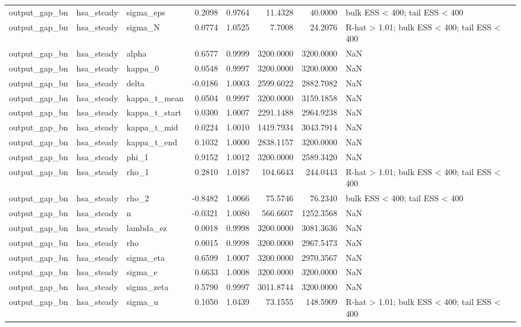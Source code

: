 \begin{tabular}{lllrrrrl}
output\_gap\_bn & hsa\_steady & sigma\_eps & 0.2098 & 0.9764 & 11.4328 & 40.0000 & bulk ESS < 400; tail ESS < 400 \\
output\_gap\_bn & hsa\_steady & sigma\_N & 0.0774 & 1.0525 & 7.7008 & 24.2076 & R-hat > 1.01; bulk ESS < 400; tail ESS < 400 \\
output\_gap\_bn & hsa\_steady & alpha & 0.6577 & 0.9999 & 3200.0000 & 3200.0000 & NaN \\
output\_gap\_bn & hsa\_steady & kappa\_0 & 0.0548 & 0.9997 & 3200.0000 & 3200.0000 & NaN \\
output\_gap\_bn & hsa\_steady & delta & -0.0186 & 1.0003 & 2599.6022 & 2882.7082 & NaN \\
output\_gap\_bn & hsa\_steady & kappa\_t\_mean & 0.0504 & 0.9997 & 3200.0000 & 3159.1858 & NaN \\
output\_gap\_bn & hsa\_steady & kappa\_t\_start & 0.0300 & 1.0007 & 2291.1488 & 2964.9238 & NaN \\
output\_gap\_bn & hsa\_steady & kappa\_t\_mid & 0.0224 & 1.0010 & 1419.7934 & 3043.7914 & NaN \\
output\_gap\_bn & hsa\_steady & kappa\_t\_end & 0.1032 & 1.0000 & 2838.1157 & 3200.0000 & NaN \\
output\_gap\_bn & hsa\_steady & phi\_1 & 0.9152 & 1.0012 & 3200.0000 & 2589.3420 & NaN \\
output\_gap\_bn & hsa\_steady & rho\_1 & 0.2810 & 1.0187 & 104.6643 & 244.0443 & R-hat > 1.01; bulk ESS < 400; tail ESS < 400 \\
output\_gap\_bn & hsa\_steady & rho\_2 & -0.8482 & 1.0066 & 75.5746 & 76.2340 & bulk ESS < 400; tail ESS < 400 \\
output\_gap\_bn & hsa\_steady & n & -0.0321 & 1.0080 & 566.6607 & 1252.3568 & NaN \\
output\_gap\_bn & hsa\_steady & lambda\_ez & 0.0018 & 0.9998 & 3200.0000 & 3081.3636 & NaN \\
output\_gap\_bn & hsa\_steady & rho & 0.0015 & 0.9998 & 3200.0000 & 2967.5473 & NaN \\
output\_gap\_bn & hsa\_steady & sigma\_eta & 0.6599 & 1.0007 & 3200.0000 & 2970.3567 & NaN \\
output\_gap\_bn & hsa\_steady & sigma\_e & 0.6633 & 1.0008 & 3200.0000 & 3200.0000 & NaN \\
output\_gap\_bn & hsa\_steady & sigma\_zeta & 0.5790 & 0.9997 & 3011.8744 & 3200.0000 & NaN \\
output\_gap\_bn & hsa\_steady & sigma\_u & 0.1050 & 1.0439 & 73.1555 & 148.5909 & R-hat > 1.01; bulk ESS < 400; tail ESS < 400 \\

\end{tabular}
